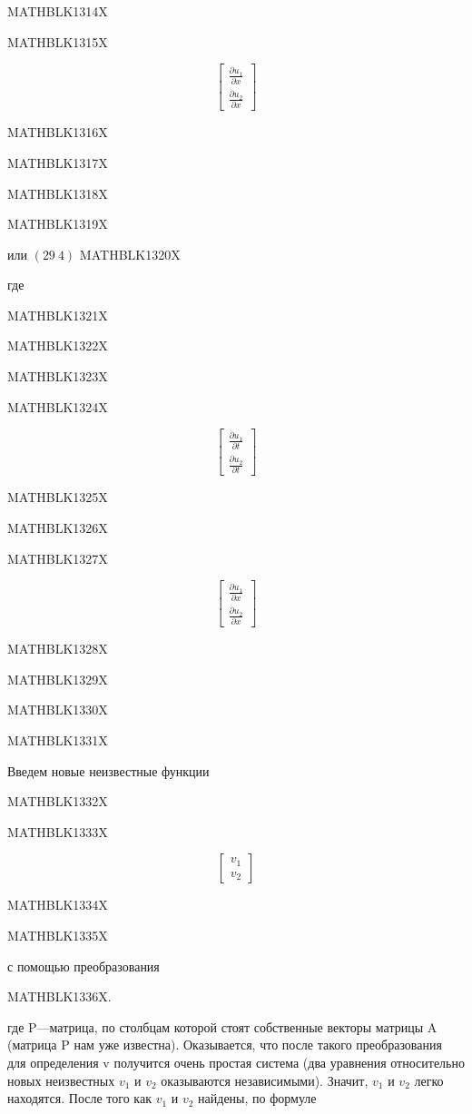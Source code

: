 \documentclass[
]{article}
\begin{document}
MATHBLK1314X

MATHBLK1315X

\[
\begin{bmatrix} \frac{\partial u_1}{\partial x} \\ \frac{\partial u_2}{\partial x} \end{bmatrix}
\]

MATHBLK1316X

MATHBLK1317X

MATHBLK1318X

MATHBLK1319X

или \((29 \ 4)\) MATHBLK1320X

где

MATHBLK1321X

MATHBLK1322X

MATHBLK1323X

MATHBLK1324X

\[
\begin{bmatrix} \frac{\partial u_1}{\partial t} \\ \frac{\partial u_2}{\partial t} \end{bmatrix}
\]

MATHBLK1325X

MATHBLK1326X

MATHBLK1327X

\[
\begin{bmatrix} \frac{\partial u_1}{\partial x} \\ \frac{\partial u_2}{\partial x} \end{bmatrix}
\]

MATHBLK1328X

MATHBLK1329X

MATHBLK1330X

MATHBLK1331X

Введем новые неизвестные функции

MATHBLK1332X

MATHBLK1333X

\[
\begin{bmatrix} v_1 \\ v_2 \end{bmatrix}
\]

MATHBLK1334X

MATHBLK1335X

с помощью преобразования

MATHBLK1336X.

где P---матрица, по столбцам которой стоят собственные векторы матрицы A
(матрица P нам уже известна). Оказывается, что после такого
преобразования для определения v получится очень простая система (два
уравнения относительно новых неизвестных \(v_1\) и \(v_2\) оказываются
независимыми). Значит, \(v_1\) и \(v_2\) легко находятся. После того как
\(v_1\) и \(v_2\) найдены, по формуле
\end{document}
